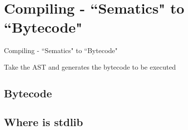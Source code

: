 \section{Compiling - ``Sematics" to ``Bytecode"}
\begin{frame}{Compiling - ``Sematics" to ``Bytecode"}
    \begin{itemize}
        {\LARGE \item[-] Take the AST and generates the bytecode to be executed}
    \end{itemize}
\end{frame}

\subsection{Bytecode}
\subsection{Where is {\ttfamily stdlib}}

